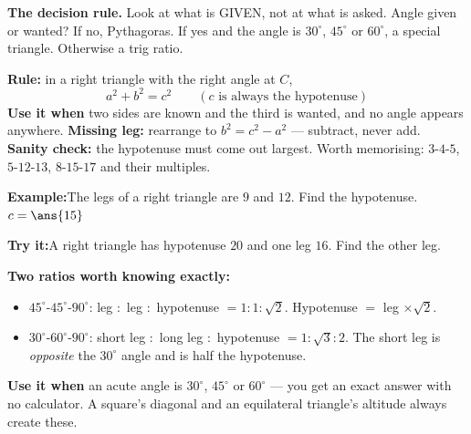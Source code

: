 \documentclass[12pt]{article}
\begin{document}

\noindent\small \textbf{The decision rule.} Look at what is GIVEN, not at what
is asked. Angle given or wanted? If no, Pythagoras. If yes and the angle is
$30^\circ$, $45^\circ$ or $60^\circ$, a special triangle. Otherwise a trig
ratio.\normalsize


\begin{formulabox}
\textbf{Rule:} in a right triangle with the right angle at $C$,
\[ a^2 + b^2 = c^2 \qquad (c \text{ is always the hypotenuse}) \]
\textbf{Use it when} two sides are known and the third is wanted, and no angle
appears anywhere. \textbf{Missing leg:} rearrange to $b^2 = c^2 - a^2$ ---
subtract, never add.\\[3pt]
\textbf{Sanity check:} the hypotenuse must come out largest. Worth memorising:
$3$-$4$-$5$, $5$-$12$-$13$, $8$-$15$-$17$ and their multiples.
\end{formulabox}

\begin{examplebox}
\textbf{Example:}\quad The legs of a right triangle are $9$ and $12$. Find the
hypotenuse.
$c = \ans{15}$
\end{examplebox}

\begin{tryitbox}
\textbf{Try it:}\quad A right triangle has hypotenuse $20$ and one leg $16$.
Find the other leg.\\[2pt]
\end{tryitbox}


\begin{formulabox}
\textbf{Two ratios worth knowing exactly:}
\begin{itemize}[leftmargin=0.8cm, itemsep=1pt, topsep=1pt]
  \item $45^\circ$-$45^\circ$-$90^\circ$: \; leg $:$ leg $:$ hypotenuse
        $= 1 : 1 : \sqrt{2}$. \; Hypotenuse $=$ leg $\times \sqrt{2}$.
  \item $30^\circ$-$60^\circ$-$90^\circ$: \; short leg $:$ long leg $:$
        hypotenuse $= 1 : \sqrt{3} : 2$. The short leg is \emph{opposite} the
        $30^\circ$ angle and is half the hypotenuse.
\end{itemize}
\textbf{Use it when} an acute angle is $30^\circ$, $45^\circ$ or $60^\circ$ ---
you get an exact answer with no calculator. A square's diagonal and an
equilateral triangle's altitude always create these.
\end{formulabox}
\end{document}
